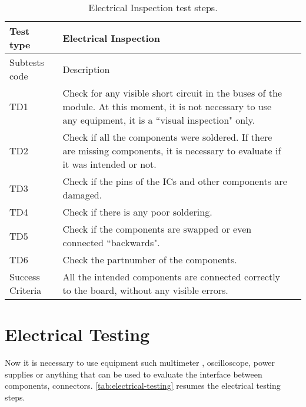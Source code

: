 \begin{table}[!htb]
\centering
\caption{Electrical Inspection test steps.}
\label{tab:electrical-inspection}
\begin{tabular}{m{3cm} m{12cm} m{3cm}}
\toprule
Test type & Electrical Inspection \\
\midrule
\midrule
Subtests code & Description \\ 
\midrule
TD1 & Check for any visible short circuit in the buses of the module. At this moment, it is not necessary to use any equipment, it is a ``visual inspection" only. \\
\midrule
TD2 & Check if all the components were soldered. If there are missing components, it is necessary to evaluate if it was intended or not. \\
\midrule
TD3 & Check if the pins of the ICs and other components are damaged. \\
\midrule
TD4 & Check if there is any poor soldering. \\
\midrule
TD5 & Check if the components are swapped or even connected ``backwards". \\
\midrule
TD6 & Check the partnumber of the components. \\
\midrule
\midrule
Success Criteria & All the intended components are connected correctly to the board, without any visible errors. \\
\bottomrule
\end{tabular}
\end{table}


\section {Electrical Testing}

Now it is necessary to use equipment such multimeter , oscilloscope, power supplies or anything that can be used to evaluate the interface between components, connectors. \autoref{tab:electrical-testing} resumes the electrical testing steps.

